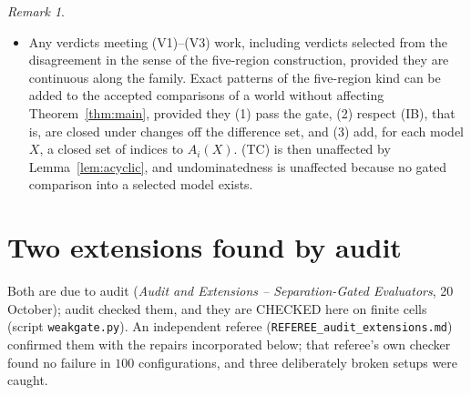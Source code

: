 \documentclass[11pt]{article}
\theoremstyle{definition}\newtheorem{definition}[theorem]{Definition}
\theoremstyle{remark}\newtheorem{remark}[theorem]{Remark}
\newcommand{\on}{\mathrm{on}}
\newcommand{\off}{\mathrm{off}}
\begin{document}
\begin{remark}
\begin{itemize}[leftmargin=*,itemsep=2pt]
\emph{continuum} of keys, low keys first: $X$ is strictly better than $Y$ when
some $\{k<c\}$ meets $T^\on_i(X,Y)$ in a non-null set and $T^\off_i(X,Y)$ in a
null set. It is not lexicographic over countably many additive criteria, but
only for the trivial reason that such orders are complete and these worlds are
not. Whether the write-up's lexicographic exclusions apply to sub-relations of
a lexicographic order has not been examined.
\item Any verdicts meeting (V1)--(V3) work, including verdicts selected from
the disagreement in the sense of the five-region construction, provided they
are continuous along the family. Exact patterns of the five-region kind can
be added to the accepted comparisons of a world without affecting
Theorem~\ref{thm:main}, provided they (1) pass the gate, (2) respect (IB), that
is, are closed under changes off the difference set, and (3) add, for each
model $X$, a closed set of indices to $A_i(X)$. (TC) is then unaffected by
Lemma~\ref{lem:acyclic}, and undominatedness is unaffected because no gated
comparison into a selected model exists.
\end{itemize}
\end{remark}


\section{Two extensions found by audit}\label{sec:audit}

Both are due to audit (\emph{Audit and Extensions -- Separation-Gated
Evaluators}, 20 October); audit checked them, and they are CHECKED here on
finite cells (script \texttt{weakgate.py}). An independent referee
(\texttt{REFEREE\_audit\_extensions.md}) confirmed them with the repairs
incorporated below; that referee's own checker found no failure in $100$
configurations, and three deliberately broken setups were caught.
\end{document}
